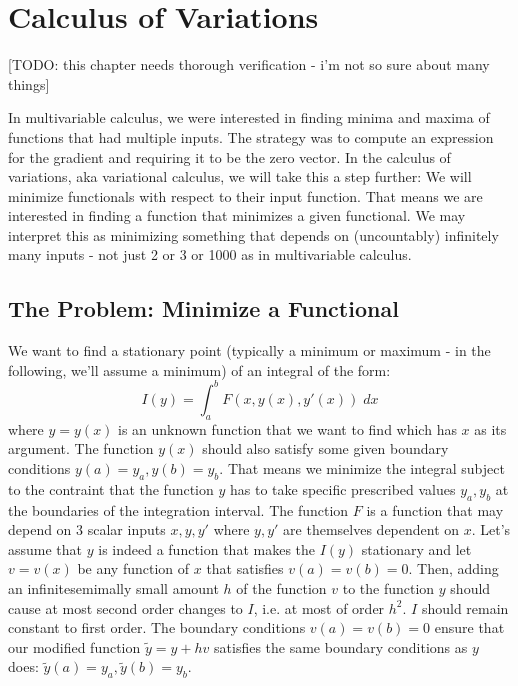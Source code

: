 \section{Calculus of Variations} 

[TODO: this chapter needs thorough verification - i'm not so sure about many things]

In multivariable calculus, we were interested in finding minima and maxima of functions that had multiple inputs. The strategy was to compute an expression for the gradient and requiring it to be the zero vector. In the calculus of variations, aka variational calculus, we will take this a step further: We will minimize functionals with respect to their input function. That means we are interested in finding a function that minimizes a given functional. We may interpret this as minimizing something that depends on (uncountably) infinitely many inputs - not just 2 or 3 or 1000 as in multivariable calculus.


\subsection{The Problem: Minimize a Functional}
We want to find a stationary point (typically a minimum or maximum - in the following, we'll assume a minimum) of an integral of the form:
\begin{equation}
 I(y) = \int_a^b F(x,y(x),y'(x)) \; dx
\end{equation}
where $y = y(x)$ is an unknown function that we want to find which has $x$ as its argument. The function $y(x)$ should also satisfy some given boundary conditions $y(a) = y_a, y(b) = y_b$. That means we minimize the integral subject to the contraint that the function $y$ has to take specific prescribed values $y_a, y_b$ at the boundaries of the integration interval. The function $F$ is a function that may depend on 3 scalar inputs $x,y,y'$ where $y,y'$ are themselves dependent on $x$. Let's assume that $y$ is indeed a function that makes the $I(y)$ stationary and let $v = v(x)$ be any function of $x$ that satisfies $v(a) = v(b) = 0$. Then, adding an infinitesemimally small amount $h$ of the function $v$ to the function $y$ should cause at most second order changes to $I$, i.e. at most of order $h^2$. $I$ should remain constant to first order. The boundary conditions $v(a) = v(b) = 0$ ensure that our modified function $\tilde{y} = y + h v$ satisfies the same boundary conditions as $y$ does: $\tilde{y}(a) = y_a, \tilde{y}(b) = y_b$.

